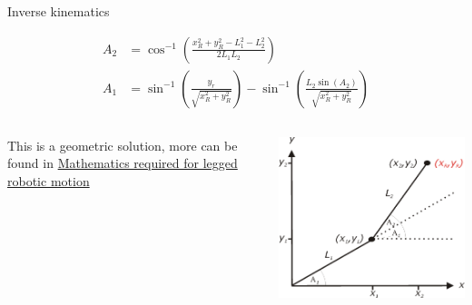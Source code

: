 \documentclass[compress]{beamer}
\begin{document}
\begin{frame}{Inverse kinematics}

    \begin{align*}
        A_2 &= \cos^{-1} \left( \frac{x_R^2+y_R^2-L_1^2-L_2^2}{2L_1L_2} \right) \\
        A_1 &= \sin^{-1} \left( \frac{y_r}{\sqrt{x_R^2+y_R^2}} \right)-\sin^{-1}\left( \frac{L_2 \sin(A_2)}{\sqrt{x_R^2+y_R^2}} \right)
    \end{align*}

    \begin{columns}
        \begin{column}{0.5\linewidth}

        This is a geometric solution, more can be found in
            \href{http://www.tribotix.info/Articles\&Tutorials/MathsforRobotics/Mathematics\%20required\%20for\%20Robotic\%20Motion.pdf}{Mathematics
            required for legged robotic motion}

        \end{column}
        \begin{column}{0.5\linewidth}
            \begin{center}
                \includegraphics[width=0.7\linewidth]{image32}
            \end{center}
        \end{column}
    \end{columns}

\end{frame}
\end{document}
